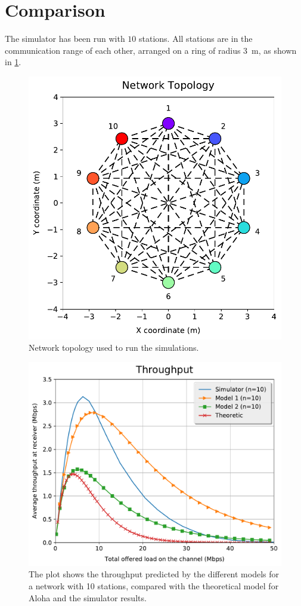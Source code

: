 \section{Comparison}
\label{sec:comparison}

The simulator has been run with $10$ stations.
All stations are in the communication range of each other, arranged on a ring of radius \SI{3}{\meter}, as shown in \cref {fig:topology}.

\begin{figure}[h!]
	\centering
	\includegraphics[width=.9\columnwidth]{figures/topology}
	\caption{Network topology used to run the simulations.}
	\label{fig:topology}
\end{figure}

\begin{figure}[t]
	\centering
	\includegraphics[width=.99\columnwidth]{figures/tr_10}
	\caption{The plot shows the throughput predicted by the different models for a network with 10 stations, compared with the theoretical model for Aloha and the simulator results.}
	\label{fig:tr_10}
\end{figure}


